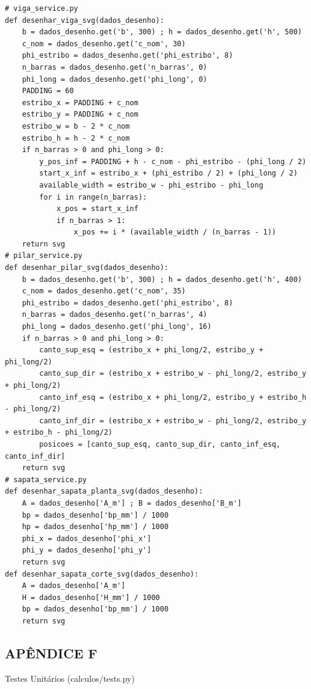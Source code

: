 \newpage
\begin{lstlisting}[style=PythonStyle, basicstyle=\ttfamily\normalsize, caption={Funções de desenho SVG dos elementos estruturais}, label={lst:svg_services}]
# viga_service.py
def desenhar_viga_svg(dados_desenho):
    b = dados_desenho.get('b', 300) ; h = dados_desenho.get('h', 500)
    c_nom = dados_desenho.get('c_nom', 30)
    phi_estribo = dados_desenho.get('phi_estribo', 8)
    n_barras = dados_desenho.get('n_barras', 0)
    phi_long = dados_desenho.get('phi_long', 0)
    PADDING = 60
    estribo_x = PADDING + c_nom
    estribo_y = PADDING + c_nom
    estribo_w = b - 2 * c_nom
    estribo_h = h - 2 * c_nom
    if n_barras > 0 and phi_long > 0:
        y_pos_inf = PADDING + h - c_nom - phi_estribo - (phi_long / 2)
        start_x_inf = estribo_x + (phi_estribo / 2) + (phi_long / 2)
        available_width = estribo_w - phi_estribo - phi_long
        for i in range(n_barras):
            x_pos = start_x_inf
            if n_barras > 1:
                x_pos += i * (available_width / (n_barras - 1))
    return svg
# pilar_service.py
def desenhar_pilar_svg(dados_desenho):
    b = dados_desenho.get('b', 300) ; h = dados_desenho.get('h', 400)
    c_nom = dados_desenho.get('c_nom', 35)
    phi_estribo = dados_desenho.get('phi_estribo', 8)
    n_barras = dados_desenho.get('n_barras', 4)
    phi_long = dados_desenho.get('phi_long', 16)
    if n_barras > 0 and phi_long > 0:
        canto_sup_esq = (estribo_x + phi_long/2, estribo_y + phi_long/2)
        canto_sup_dir = (estribo_x + estribo_w - phi_long/2, estribo_y + phi_long/2)
        canto_inf_esq = (estribo_x + phi_long/2, estribo_y + estribo_h - phi_long/2)
        canto_inf_dir = (estribo_x + estribo_w - phi_long/2, estribo_y + estribo_h - phi_long/2)
        posicoes = [canto_sup_esq, canto_sup_dir, canto_inf_esq, canto_inf_dir]
    return svg
# sapata_service.py
def desenhar_sapata_planta_svg(dados_desenho):
    A = dados_desenho['A_m'] ; B = dados_desenho['B_m']
    bp = dados_desenho['bp_mm'] / 1000
    hp = dados_desenho['hp_mm'] / 1000
    phi_x = dados_desenho['phi_x']
    phi_y = dados_desenho['phi_y']
    return svg
def desenhar_sapata_corte_svg(dados_desenho):
    A = dados_desenho['A_m']
    H = dados_desenho['H_mm'] / 1000
    bp = dados_desenho['bp_mm'] / 1000
    return svg
\end{lstlisting}

\newpage
{}
\begin{center}
\section*{APÊNDICE F}
Testes Unitários (calculos/tests.py)
\end{center}

